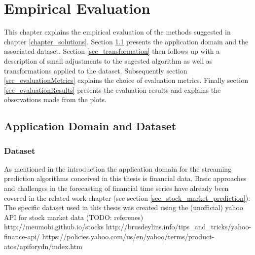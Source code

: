 \chapter{Empirical Evaluation}
\label{chapter_evaluation}

\ifpdf
    \graphicspath{{Chapter5/Figs/Raster/}{Chapter5/Figs/PDF/}{Chapter5/Figs/}}
\else
    \graphicspath{{Chapter5/Figs/Vector/}{Chapter5/Figs/}}
\fi

This chapter explains the empirical evaluation of the methods suggested in chapter \ref{chapter_solutions}. Section \ref{sec_applicationDomain} presents the application domain and the associated dataset. Section \ref{sec_transformation} then follows up with a description of small adjustments to the sugested algorithm as well as transformations applied to the dataset. Subsequently section \ref{sec_evaluationMetrics} explains the choice of evaluation metrics. Finally section \ref{sec_evaluationResults} presents the evaluation results and explains the observations made from the plots.

\section{Application Domain and Dataset}
\label{sec_applicationDomain}

\subsection{Dataset}
As mentioned in the introduction the application domain for the streaming prediction algorithms conceived in this thesis is financial data. Basic approaches and challenges in the forecasting of financial time series have already been covered in the related work chapter (see section \ref{sec_stock_market_prediction}). The specific dataset used in this thesis was created using the (unofficial) yahoo API for stock market data (TODO: referenes)
\\
http://meumobi.github.io/stocks%
http://brusdeylins.info/tips_and_tricks/yahoo-finance-api/
https://policies.yahoo.com/us/en/yahoo/terms/product-atos/apiforydn/index.htm

